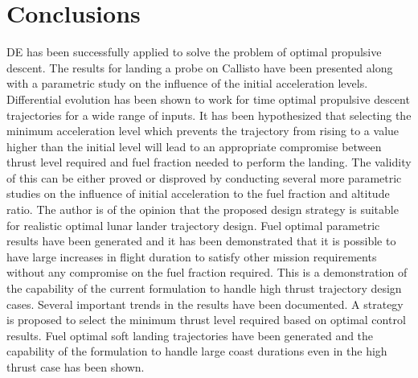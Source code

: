 \section{Conclusions}
DE has been successfully applied to solve the problem of optimal propulsive descent. The results for landing a probe on Callisto have been presented along with a parametric study on the influence of the initial acceleration levels. Differential evolution has been shown to work for time optimal propulsive descent trajectories for a wide range of inputs. It has been hypothesized that selecting the minimum acceleration level which prevents the trajectory from rising to a value higher than the initial level will lead to an appropriate compromise between thrust level required and fuel fraction needed to perform the landing. The validity of this can be either proved or disproved by conducting several more parametric studies on the influence of initial acceleration to the fuel fraction and altitude ratio. The author is of the opinion that the proposed design strategy is suitable for realistic optimal lunar lander trajectory design. Fuel optimal parametric results have been generated and it has been demonstrated that it is possible to have large increases in flight duration to satisfy other mission requirements without any compromise on the fuel fraction required.
This is a demonstration of the capability of the current formulation to handle high thrust trajectory design cases. Several important trends in the results have been documented. A strategy is proposed to select the minimum thrust level required based on optimal control results. Fuel optimal soft landing trajectories have been generated and the capability of the formulation to handle large coast durations even in the high thrust case has been shown.\\